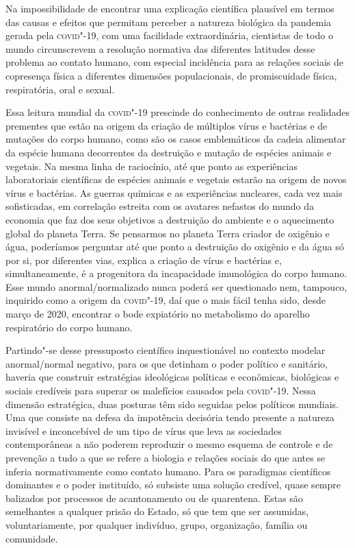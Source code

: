Na impossibilidade de encontrar uma explicação científica plausível em
termos das causas e efeitos que permitam perceber a natureza biológica
da pandemia gerada pela \textsc{covid}"-19, com uma facilidade extraordinária,
cientistas de todo o mundo circunscrevem a resolução normativa das
diferentes latitudes desse problema ao contato humano, com especial
incidência para as relações sociais de copresença física a diferentes
dimensões populacionais, de promiscuidade física, respiratória, oral e
sexual.

Essa leitura mundial da \textsc{covid}"-19 prescinde do conhecimento de outras
realidades prementes que estão na origem da criação de múltiplos vírus e
bactérias e de mutações do corpo humano, como são os casos emblemáticos
da cadeia alimentar da espécie humana decorrentes da destruição e
mutação de espécies animais e vegetais. Na mesma linha de raciocínio,
até que ponto as experiências laboratoriais científicas de espécies
animais e vegetais estarão na origem de novos vírus e bactérias. As
guerras químicas e as experiências nucleares, cada vez mais
sofisticadas, em correlação estreita com os avatares nefastos do mundo
da economia que faz dos seus objetivos a destruição do ambiente e o
aquecimento global do planeta Terra. Se pensarmos no planeta Terra
criador de oxigênio e água, poderíamos perguntar até que ponto a
destruição do oxigênio e da água só por si, por diferentes vias, explica
a criação de vírus e bactérias e, simultaneamente, é a progenitora da
incapacidade imunológica do corpo humano. Esse mundo anormal/normalizado
nunca poderá ser questionado nem, tampouco, inquirido como a origem da
\textsc{covid}"-19, daí que o mais fácil tenha sido, desde março de 2020,
encontrar o bode expiatório no metabolismo do aparelho respiratório do
corpo humano.

Partindo"-se desse pressuposto científico inquestionável no contexto
modelar anormal/normal negativo, para os que detinham o poder político e
sanitário, haveria que construir estratégias ideológicas políticas e
econômicas, biológicas e sociais credíveis para superar os malefícios
causados pela \textsc{covid}"-19. Nessa dimensão estratégica, duas posturas têm
sido seguidas pelos políticos mundiais. Uma que consiste na defesa da
impotência decisória tendo presente a natureza invisível e inconcebível
de um tipo de vírus que leva as sociedades contemporâneas a não poderem
reproduzir o mesmo esquema de controle e de prevenção a tudo a que se
refere a biologia e relações sociais do que antes se inferia
normativamente como contato humano. Para os paradigmas científicos
dominantes e o poder instituído, só subsiste uma solução credível, quase
sempre balizados por processos de acantonamento ou de quarentena. Estas
são semelhantes a qualquer prisão do Estado, só que tem que ser
assumidas, voluntariamente, por qualquer indivíduo, grupo, organização,
família ou comunidade.

